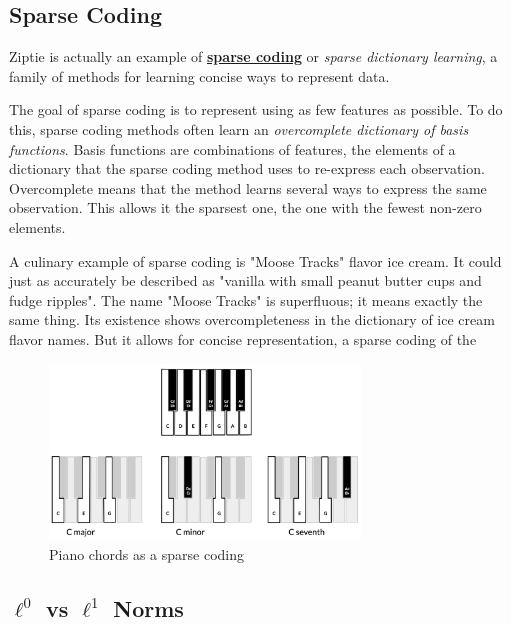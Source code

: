 \subsection{Sparse Coding}
\label{subsec:sparsecoding}

Ziptie is actually an example of
\textbf{\href{https://en.wikipedia.org/wiki/Sparse_dictionary_learning}
{sparse coding}} or \textit{sparse dictionary learning}, a family of methods
for learning concise ways to represent data. 

The goal of sparse coding is to represent using as few features as possible.
To do this, sparse coding methods often learn an
\textit{overcomplete dictionary of basis functions}.
Basis functions are combinations of features, the elements of a
dictionary that the sparse coding method uses to re-express each
observation.
Overcomplete means that the method learns several ways to express
the same observation. This allows it the sparsest one, the one with
the fewest non-zero elements.

A culinary example of sparse coding is "Moose Tracks" flavor ice cream.
It could just as accurately be described as "vanilla with small
peanut butter cups and fudge ripples". The name "Moose Tracks" is
superfluous; it means exactly the same thing.
Its existence shows overcompleteness in the dictionary
of ice cream flavor names. But it allows for concise representation,
a sparse coding of the 

\begin{figure}[ht]
\vskip 0.2in
\begin{center}
\centerline{\includegraphics[width=3.25in]{images/chords.png}}
\caption{Piano chords as a sparse coding}
\label{fig:chords}
\end{center}
\vskip -0.2in
\end{figure}

\subsection{$\ell^0$ vs $\ell^1$ Norms}
\label{subsec:sparsenorms}

